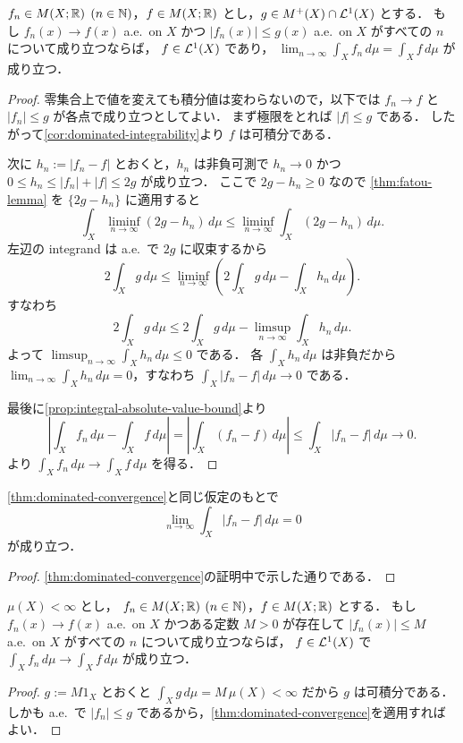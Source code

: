 \begin{theorem}[優収束定理]\label{thm:dominated-convergence}
$f_n\in M(X;\mathbb R)$ $(n\in\mathbb N)$，$f\in M(X;\mathbb R)$ とし，$g\in M^+(X)\cap\mathcal L^1(X)$ とする．
もし $f_n(x)\to f(x)$ a.e.\ on $X$ かつ $|f_n(x)|\le g(x)$ a.e.\ on $X$ がすべての $n$ について成り立つならば，
$f\in\mathcal L^1(X)$ であり，
$\lim_{n\to\infty}\int_X f_n\,d\mu=\int_X f\,d\mu$ が成り立つ．
\end{theorem}
\begin{proof}
零集合上で値を変えても積分値は変わらないので，以下では $f_n\to f$ と $|f_n|\le g$ が各点で成り立つとしてよい．
まず極限をとれば $|f|\le g$ である．
したがって\cref{cor:dominated-integrability}より $f$ は可積分である．

次に $h_n:=|f_n-f|$ とおくと，$h_n$ は非負可測で
$h_n\to 0$ かつ $0\le h_n\le |f_n|+|f|\le 2g$ が成り立つ．
ここで $2g-h_n \ge 0$ なので \cref{thm:fatou-lemma} を $\{2g-h_n\}$ に適用すると
\[
\int_X \liminf_{n\to\infty}(2g-h_n)\,d\mu
\le \liminf_{n\to\infty}\int_X (2g-h_n)\,d\mu.
\]
左辺の integrand は a.e.\ で $2g$ に収束するから
\[
2\int_X g\,d\mu
\le \liminf_{n\to\infty}\left(2\int_X g\,d\mu-\int_X h_n\,d\mu\right).
\]
すなわち
\[
2\int_X g\,d\mu
\le 2\int_X g\,d\mu-\limsup_{n\to\infty}\int_X h_n\,d\mu.
\]
よって
$\limsup_{n\to\infty}\int_X h_n\,d\mu\le 0$ である．
各 $\int_X h_n\,d\mu$ は非負だから
$\lim_{n\to\infty}\int_X h_n\,d\mu=0$，すなわち $\int_X |f_n-f|\,d\mu \to 0$ である．

最後に\cref{prop:integral-absolute-value-bound}より
\[
\left|\int_X f_n\,d\mu-\int_X f\,d\mu\right|
=\left|\int_X (f_n-f)\,d\mu\right|
\le \int_X |f_n-f|\,d\mu
\to 0.
\]
より $\int_X f_n\,d\mu\to \int_X f\,d\mu$ を得る．
\end{proof}

\begin{corollary}[$L^1$ 収束版の優収束定理]\label{cor:dominated-convergence-l1}
\cref{thm:dominated-convergence}と同じ仮定のもとで
\[
\lim_{n\to\infty}\int_X |f_n-f|\,d\mu=0
\]
が成り立つ．
\end{corollary}
\begin{proof}
\cref{thm:dominated-convergence}の証明中で示した通りである．
\end{proof}

\begin{corollary}[有界収束定理]\label{cor:bounded-convergence}
$\mu(X)<\infty$ とし，
$f_n\in M(X;\mathbb R)$ $(n\in\mathbb N)$，$f\in M(X;\mathbb R)$ とする．
もし $f_n(x)\to f(x)$ a.e.\ on $X$ かつある定数 $M>0$ が存在して
$|f_n(x)|\le M$ a.e.\ on $X$ がすべての $n$ について成り立つならば，
$f\in\mathcal L^1(X)$ で $\int_X f_n\,d\mu\to \int_X f\,d\mu$ が成り立つ．
\end{corollary}
\begin{proof}
$g:=M1_X$ とおくと $\int_X g\,d\mu=M\,\mu(X)<\infty$ だから $g$ は可積分である．
しかも a.e.\ で $|f_n|\le g$ であるから，\cref{thm:dominated-convergence}を適用すればよい．
\end{proof}

